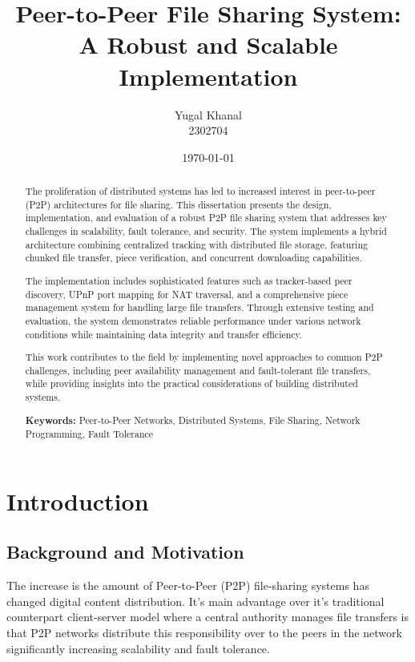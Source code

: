 \documentclass[12pt,a4paper]{report}
\title{Peer-to-Peer File Sharing System:\\A Robust and Scalable Implementation}
\author{Yugal Khanal\\2302704}
\date{\today}
\begin{document}
\maketitle

\begin{abstract}
	The proliferation of distributed systems has led to increased interest in peer-to-peer (P2P) architectures for file sharing. This dissertation presents the design, implementation, and evaluation of a robust P2P file sharing system that addresses key challenges in scalability, fault tolerance, and security. The system implements a hybrid architecture combining centralized tracking with distributed file storage, featuring chunked file transfer, piece verification, and concurrent downloading capabilities.

	The implementation includes sophisticated features such as tracker-based peer discovery, UPnP port mapping for NAT traversal, and a comprehensive piece management system for handling large file transfers. Through extensive testing and evaluation, the system demonstrates reliable performance under various network conditions while maintaining data integrity and transfer efficiency.

	This work contributes to the field by implementing novel approaches to common P2P challenges, including peer availability management and fault-tolerant file transfers, while providing insights into the practical considerations of building distributed systems.

	\textbf{Keywords:} Peer-to-Peer Networks, Distributed Systems, File Sharing, Network Programming, Fault Tolerance
\end{abstract}

\tableofcontents
\listoffigures
\listoftables

\chapter{Introduction}
\section{Background and Motivation}
The increase is the amount of Peer-to-Peer (P2P) file-sharing systems has changed digital content distribution. It's main advantage over it's traditional counterpart client-server model where a central authority manages file transfers is that P2P networks distribute this responsibility over to the peers in the network significantly increasing scalability and fault tolerance.
\end{document}
